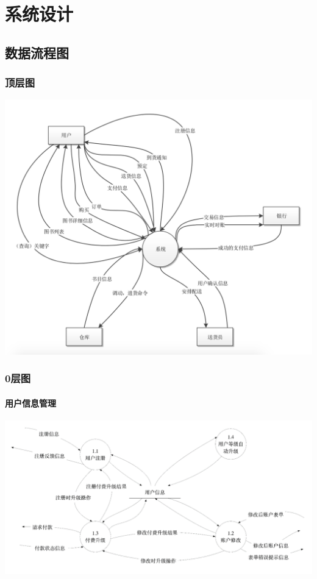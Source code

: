\chapter{系统设计}
\section{数据流程图}
\subsection{顶层图}
\begin{center}
    \includegraphics[width=1\linewidth]{img/0.png}
\end{center}
\subsection{0层图}
\subsubsection{用户信息管理}
\begin{center}
    \includegraphics[width=1\linewidth]{img/1.png}
\end{center}
